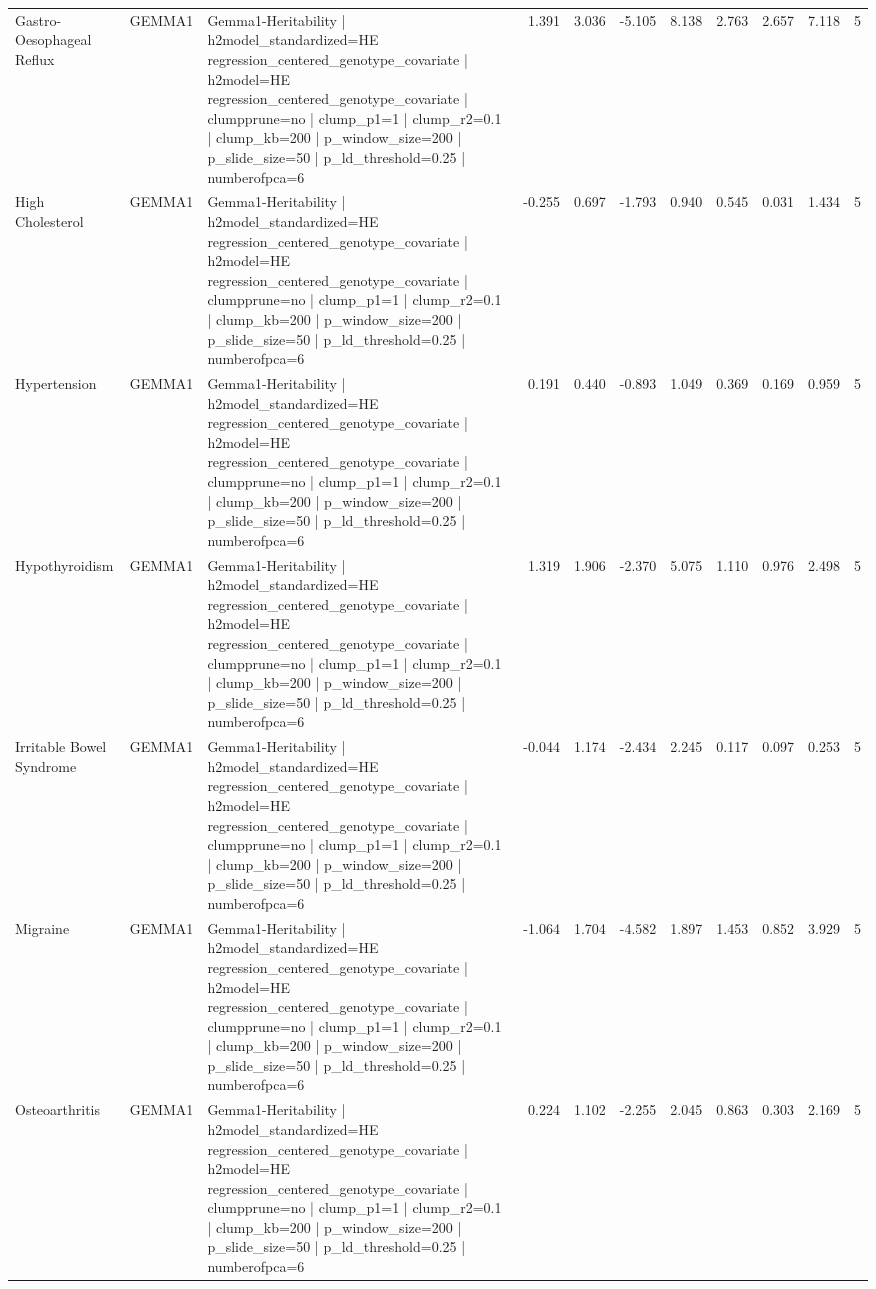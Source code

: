 \begin{landscape}
\begin{longtable}{p{2.4cm}p{1.8cm}p{6.0cm}rrrrrrrr}
Gastro-Oesophageal Reflux & GEMMA1 & Gemma1-Heritability | h2model\_standardized=HE regression\_centered\_genotype\_covariate | h2model=HE regression\_centered\_genotype\_covariate | clumpprune=no | clump\_p1=1 | clump\_r2=0.1 | clump\_kb=200 | p\_window\_size=200 | p\_slide\_size=50 | p\_ld\_threshold=0.25 | numberofpca=6 & 1.391 & 3.036 & -5.105 & 8.138 & 2.763 & 2.657 & 7.118 & 5 \\
High Cholesterol & GEMMA1 & Gemma1-Heritability | h2model\_standardized=HE regression\_centered\_genotype\_covariate | h2model=HE regression\_centered\_genotype\_covariate | clumpprune=no | clump\_p1=1 | clump\_r2=0.1 | clump\_kb=200 | p\_window\_size=200 | p\_slide\_size=50 | p\_ld\_threshold=0.25 | numberofpca=6 & -0.255 & 0.697 & -1.793 & 0.940 & 0.545 & 0.031 & 1.434 & 5 \\
Hypertension & GEMMA1 & Gemma1-Heritability | h2model\_standardized=HE regression\_centered\_genotype\_covariate | h2model=HE regression\_centered\_genotype\_covariate | clumpprune=no | clump\_p1=1 | clump\_r2=0.1 | clump\_kb=200 | p\_window\_size=200 | p\_slide\_size=50 | p\_ld\_threshold=0.25 | numberofpca=6 & 0.191 & 0.440 & -0.893 & 1.049 & 0.369 & 0.169 & 0.959 & 5 \\
Hypothyroidism & GEMMA1 & Gemma1-Heritability | h2model\_standardized=HE regression\_centered\_genotype\_covariate | h2model=HE regression\_centered\_genotype\_covariate | clumpprune=no | clump\_p1=1 | clump\_r2=0.1 | clump\_kb=200 | p\_window\_size=200 | p\_slide\_size=50 | p\_ld\_threshold=0.25 | numberofpca=6 & 1.319 & 1.906 & -2.370 & 5.075 & 1.110 & 0.976 & 2.498 & 5 \\
Irritable Bowel Syndrome & GEMMA1 & Gemma1-Heritability | h2model\_standardized=HE regression\_centered\_genotype\_covariate | h2model=HE regression\_centered\_genotype\_covariate | clumpprune=no | clump\_p1=1 | clump\_r2=0.1 | clump\_kb=200 | p\_window\_size=200 | p\_slide\_size=50 | p\_ld\_threshold=0.25 | numberofpca=6 & -0.044 & 1.174 & -2.434 & 2.245 & 0.117 & 0.097 & 0.253 & 5 \\
Migraine & GEMMA1 & Gemma1-Heritability | h2model\_standardized=HE regression\_centered\_genotype\_covariate | h2model=HE regression\_centered\_genotype\_covariate | clumpprune=no | clump\_p1=1 | clump\_r2=0.1 | clump\_kb=200 | p\_window\_size=200 | p\_slide\_size=50 | p\_ld\_threshold=0.25 | numberofpca=6 & -1.064 & 1.704 & -4.582 & 1.897 & 1.453 & 0.852 & 3.929 & 5 \\
Osteoarthritis & GEMMA1 & Gemma1-Heritability | h2model\_standardized=HE regression\_centered\_genotype\_covariate | h2model=HE regression\_centered\_genotype\_covariate | clumpprune=no | clump\_p1=1 | clump\_r2=0.1 | clump\_kb=200 | p\_window\_size=200 | p\_slide\_size=50 | p\_ld\_threshold=0.25 | numberofpca=6 & 0.224 & 1.102 & -2.255 & 2.045 & 0.863 & 0.303 & 2.169 & 5 \\

\end{longtable}
\end{landscape}
